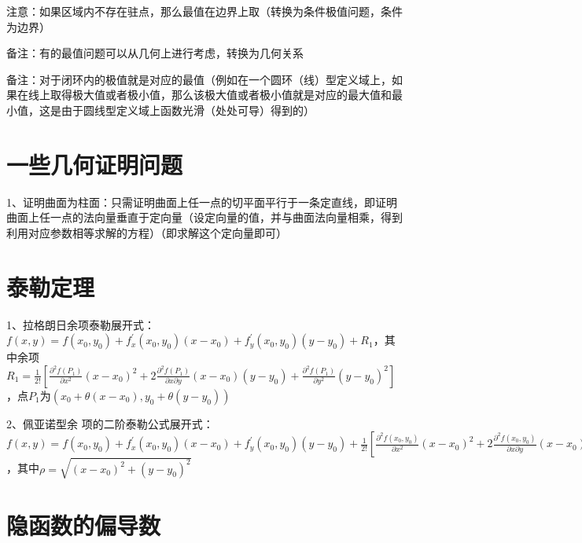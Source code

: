 注意：如果区域内不存在驻点，那么最值在边界上取（转换为条件极值问题，条件为边界）

备注：有的最值问题可以从几何上进行考虑，转换为几何关系

备注：对于闭环内的极值就是对应的最值（例如在一个圆环（线）型定义域上，如果在线上取得极大值或者极小值，那么该极大值或者极小值就是对应的最大值和最小值，这是由于圆线型定义域上函数光滑（处处可导）得到的）

\section{一些几何证明问题}

1、证明曲面为柱面：只需证明曲面上任一点的切平面平行于一条定直线，即证明曲面上任一点的法向量垂直于定向量（设定向量的值，并与曲面法向量相乘，得到利用对应参数相等求解的方程）（即求解这个定向量即可）

\section{泰勒定理}

1、拉格朗日余项泰勒展开式：$ f(x, y)=f\left(x_{0}, y_{0}\right)+f_{x}^{\prime}\left(x_{0}, y_{0}\right)\left(x-x_{0}\right)+f_{y}^{\prime}\left(x_{0}, y_{0}\right)\left(y-y_{0}\right)+R_{1} $，其中余项$ R_{1}=\frac{1}{2 !}[\frac{\partial^{2} f\left(P_{1}\right)}{\partial x^{2}}\left(x-x_{0}\right)^{2}+2 \frac{\partial^{2} f\left(P_{1}\right)}{\partial x \partial y}\left(x-x_{0}\right)\left(y-y_{0}\right)+\frac{\partial^{2} f\left(P_{1}\right)}{\partial y^{2}}\left(y-y_{0}\right)^{2}] $，点$ P_{1} $为$ \left(x_{0}+\theta\left(x-x_{0}\right), y_{0}+\theta\left(y-y_{0}\right)\right) $

2、佩亚诺型余 项的二阶泰勒公式展开式：$ f(x, y)=f\left(x_{0}, y_{0}\right)+f_{x}^{\prime}\left(x_{0}, y_{0}\right)\left(x-x_{0}\right)+f_{y}^{\prime}\left(x_{0}, y_{0}\right)\left(y-y_{0}\right)+\frac{1}{2 !}[\frac{\partial^{2} f\left(x_{0}, y_{0}\right)}{\partial x^{2}}\left(x-x_{0}\right)^{2}+2 \frac{\partial^{2} f\left(x_{0}, y_{0}\right)}{\partial x \partial y}\left(x-x_{0}\right)\left(y-y_{0}\right)+\frac{\partial^{2} f\left(x_{0}, y_{0}\right)}{\partial y^{2}}\left(y-y_{0}\right)^{2}]+o\left(\rho^{2}\right) $，其中$ \rho=\sqrt{\left(x-x_{0}\right)^{2}+\left(y-y_{0}\right)^{2}} $

\section{隐函数的偏导数}

